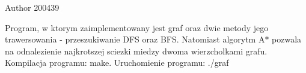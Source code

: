 \begin{DoxyAuthor}{\-Author}
200439
\end{DoxyAuthor}
\-Program, w ktorym zaimplementowany jest graf oraz dwie metody jego trawersowania -\/ przeszukiwanie \-D\-F\-S oraz \-B\-F\-S. \-Natomiast algorytm \-A$\ast$ pozwala na odnalezienie najkrotszej sciezki miedzy dwoma wierzcholkami grafu. \-Kompilacja programu\-: make. \-Uruchomienie programu\-: ./graf 